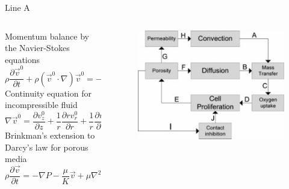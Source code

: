 \documentclass[11pt,t]{beamer}
\begin{document}
\begin{frame}[fragile]{Line A}  

	\begin{columns}[t]
		\begin{column}{.75\textwidth}
Momentum balance by the Navier-Stokes equations
\[
\rho \frac { \partial \vec { v } ^ { 0 } } { \partial t } + \rho \left( \vec { v } ^ { 0 } \cdot \nabla \right) \vec { v } ^ { 0 } = - \nabla P + \mu \nabla ^ { 2 } \vec { v } ^ { 0 } + \rho \vec { g }
\]
Continuity equation for incompressible fluid
\[
\nabla \vec { v } ^ { 0 } = \frac { \partial v _ { z } ^ { 0 } } { \partial z } + \frac { 1 } { r } \frac { \partial r v _ { r } ^ { 0 } } { \partial r } + \frac { 1 } { r } \frac { \partial v _ { \vartheta } ^ { 0 } } { \partial \vartheta } = 0
\]
Brinkman’s extension to Darcy’s law for porous media
\[
\rho \frac { \partial \vec { v } } { \partial t } = - \nabla P - \frac { \mu } { K } \vec { v } + \mu \nabla ^ { 2 } \vec { v } + \rho \vec { g }
\]


		\end{column}
		\begin{column}{.25\textwidth}
			
			\begin{figure}
			\centering
			\includegraphics[width=\textwidth]{math_scheme}
			
			\end{figure}
		\end{column}
	\end{columns}	
		
\end{frame}
\end{document}
